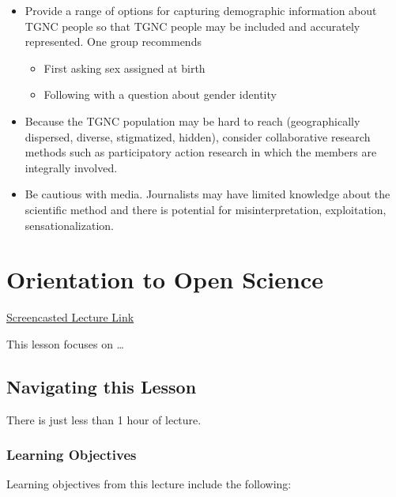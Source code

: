 \documentclass[
  english,
]{book}
\providecommand{\tightlist}{%
  \setlength{\itemsep}{0pt}\setlength{\parskip}{0pt}}
\begin{document}
\begin{itemize}
\tightlist
\item
  Provide a range of options for capturing demographic information about TGNC people so that TGNC people may be included and accurately represented. One group recommends

  \begin{itemize}
  \tightlist
  \item
    First asking sex assigned at birth
  \item
    Following with a question about gender identity
  \end{itemize}
\item
  Because the TGNC population may be hard to reach (geographically dispersed, diverse, stigmatized, hidden), consider collaborative research methods such as participatory action research in which the members are integrally involved.
\item
  Be cautious with media. Journalists may have limited knowledge about the scientific method and there is potential for misinterpretation, exploitation, sensationalization.
\end{itemize}

\hypertarget{OpenScience}{%
\chapter{Orientation to Open Science}\label{OpenScience}}

\href{https://spu.hosted.panopto.com/Panopto/Pages/Viewer.aspx?pid=a46a76d9-1d4f-404c-96e9-ac770016d7db}{Screencasted Lecture Link}

This lesson focuses on \ldots{}

\hypertarget{navigating-this-lesson-5}{%
\section{Navigating this Lesson}\label{navigating-this-lesson-5}}

There is just less than 1 hour of lecture.

\hypertarget{learning-objectives-5}{%
\subsection{Learning Objectives}\label{learning-objectives-5}}

Learning objectives from this lecture include the following:
\end{document}
